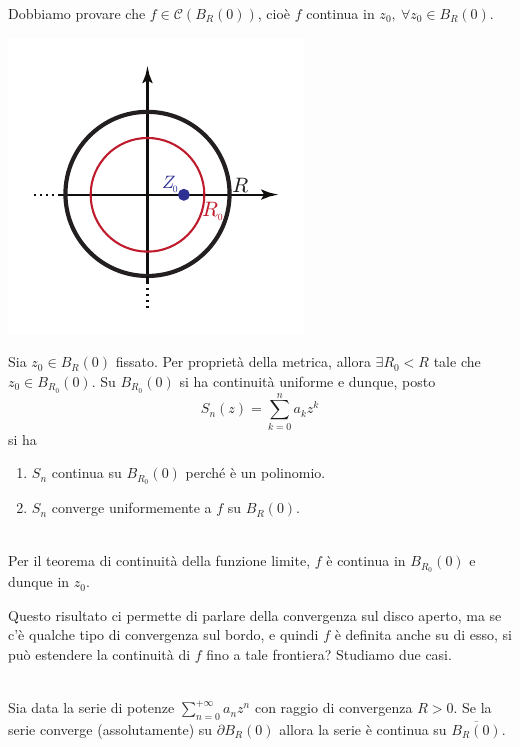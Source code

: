 \begin{demonstration}
	Dobbiamo provare che $f\in\mathcal{C}\left(B_R\left(0\right)\right)$, cioè $f$ continua in $z_0,\ \forall z_0\in B_R\left(0\right)$.	\vspace{3mm}
\begin{minipage}{0.44\textwidth}
	\includegraphics[trim=0cm 0cm 0cm 0cm, clip, scale=1.1]{images/discoconvergenzacontinuitaf.pdf}
\end{minipage}\hspace{-9mm}
\begin{minipage}{0.60\textwidth}
		Sia $z_0\in B_R\left(0\right)$ fissato. Per proprietà della metrica, allora $\exists R_0 < R$ tale che $z_0\in B_{R_0}\left(0\right)$. Su $B_{R_0}\left(0\right)$ si ha continuità uniforme e dunque, posto
	\begin{equation*}
		S_n\left(z\right)=\sum_{k=0}^{n}a_kz^k
	\end{equation*}
	si ha
	\begin{enumerate}
		\item $S_n$ continua su $B_{R_0}\left(0\right)$ perché è un polinomio.
		\item $S_n$ converge uniformemente a $f$ su $B_R\left(0\right)$.
	\end{enumerate}
\end{minipage}\\
Per il teorema di continuità della funzione limite, $f$ è continua in $B_{R_0}\left(0\right)$ e dunque in $z_0$. 
\end{demonstration}
Questo risultato ci permette di parlare della convergenza sul disco aperto, ma se c'è qualche tipo di convergenza sul bordo, e quindi $f$ è definita anche su di esso, si può estendere la continuità di $f$ fino a tale frontiera? Studiamo due casi.
\begin{corollary}~{}\\
	Sia data la serie di potenze $\displaystyle\sum_{n=0}^{+\infty}a_nz^n$ con raggio di convergenza $R>0$. Se la serie converge (assolutamente) su $\partial B_R\left(0\right)$ allora la serie è continua su $\overline{B_R\left(0\right)}$.
\end{corollary}
